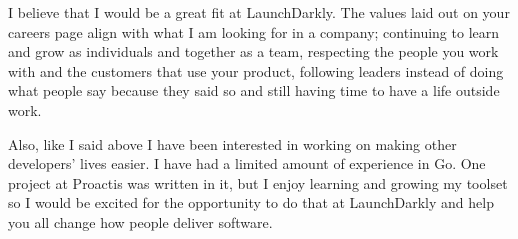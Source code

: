 \documentclass[11pt, a4paper]{awesome-cv}
\begin{document}
\begin{cvletter}
    I believe that I would be a great fit at LaunchDarkly. The values laid out on your careers page align with what I am looking for in a company; continuing to learn and grow as individuals and together as a team, respecting the people you work with and the customers that use your product, following leaders instead of doing what people say because they said so and still having time to have a life outside work. 

    Also, like I said above I have been interested in working on making other developers’ lives easier. I have had a limited amount of experience in Go. One project at Proactis was written in it, but I enjoy learning and growing my toolset so I would be excited for the opportunity to do that at LaunchDarkly and help you all change how people deliver software. 

\end{cvletter}


\makeletterclosing
\end{document}
